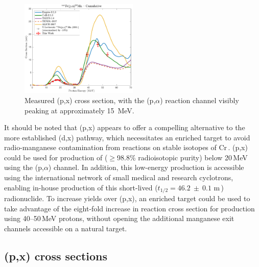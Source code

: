 \begin{figure}
 \centering
 \includegraphics[width=0.5\textwidth]{./figures/51Mn.pdf}
 \caption{Measured (p,x) cross section, with the (p,$\alpha$) reaction channel visibly peaking at approximately \mbox{15 MeV}.}
 \label{fig:51Mn}
\end{figure}




It should be noted that  (p,x) appears to offer a compelling alternative to the more established (d,x) pathway, which necessitates an enriched  target to avoid radio-manganese contamination from reactions on stable isotopes of Cr\,\cite{Klein2000}.
(p,x) could be used for 
production of   ($\geq$98.8\% radioisotopic purity) below 20\,MeV using the (p,$\alpha$) channel.
In addition, this low-energy production is accessible using the international network of small medical and research cyclotrons, enabling in-house production of this short-lived ($t_{1/2}=46.2~\pm~0.1$ m\,\cite{Wang2017}) radionuclide.
To increase yields over (p,x), an enriched  target could be used to take advantage of the eight-fold increase in reaction cross section for production using 40--50\,MeV protons, without opening the additional manganese exit channels accessible on a natural target.









\subsection{(p,x) cross sections}



